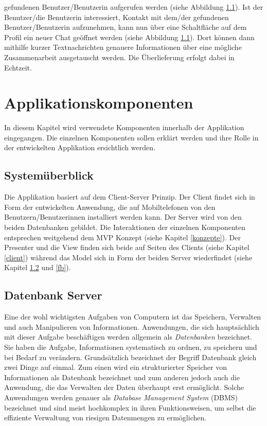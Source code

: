 \documentclass[a4paper,11pt]{report}
\begin{document}
gefundenen Benutzer/Benutzerin aufgerufen werden (siehe Abbildung \ref{}). Ist der Benutzer/die Benutzerin interessiert, Kontakt mit dem/der gefundenen Benutzer/Benutzerin aufzunehmen, kann nun über eine Schaltfläche auf dem Profil ein neuer Chat geöffnet werden (siehe Abbildung \ref{}). Dort können dann mithilfe kurzer Textnachrichten genauere Informationen über eine mögliche Zusammenarbeit ausgetauscht werden. Die Überlieferung erfolgt dabei in Echtzeit.
	
	\chapter{Applikationskomponenten}
	In diesem Kapitel wird verwendete Komponenten innerhalb der Applikation eingegangen. Die einzelnen Komponenten sollen erklärt werden und ihre Rolle in der entwickelten Applikation ersichtlich werden.
		\section{Systemüberblick}
		Die Applikation basiert auf dem Client-Server Prinzip. Der Client findet sich in Form der entwickelten Anwendung, die auf Mobiltelefonen von den Benutzern/Benutzerinnen installiert werden kann. Der Server wird von den beiden Datenbanken gebildet. Die Interaktionen der einzelnen Komponenten entsprechen weitgehend dem MVP Konzept (siehe Kapitel \ref{konzepte}). Der Presenter und die View finden sich beide auf Seiten des Clients (siehe Kapitel \ref{client}) während das Model sich in Form der beiden Server wiederfindet (siehe Kapitel \ref{server} und \ref{fb}).
		
			\section{Datenbank Server} \label{server}
			Eine der wohl wichtigsten Aufgaben von Computern ist das Speichern, Verwalten und auch Manipulieren von Informationen. Anwendungen, die sich hauptsächlich mit dieser Aufgabe beschäftigen werden allgemein als \emph{Datenbanken} bezeichnet. Sie haben die Aufgabe, Informationen systematisch zu ordnen, zu speichern und bei Bedarf zu verändern. Grundsätzlich bezeichnet der Begriff Datenbank gleich zwei Dinge auf einmal. Zum einen wird ein strukturierter Speicher von Informationen als Datenbank bezeichnet und zum anderen jedoch auch die Anwendung, die das Verwalten der Daten überhaupt erst ermöglicht. Solche Anwendungen werden genauer als \emph{Database Management System} (DBMS) bezeichnet und sind meist hochkomplex in ihren Funktionsweisen, um selbst die effiziente Verwaltung von riesigen Datenmengen zu ermöglichen. \cite{IT-Handbuch}
			
\end{document}
